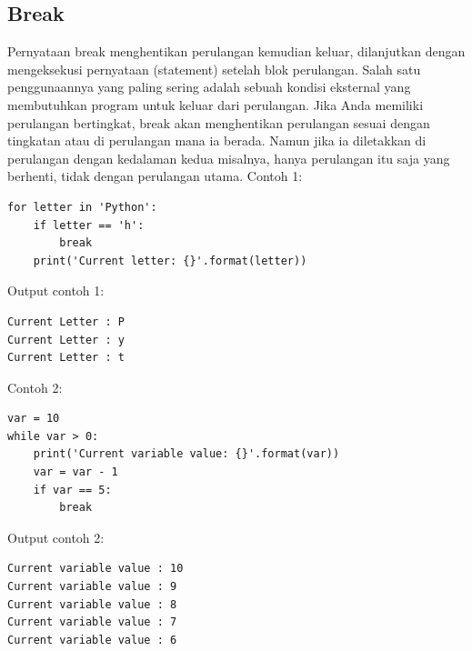 \subsection{Break}
Pernyataan break menghentikan perulangan kemudian keluar, dilanjutkan dengan mengeksekusi pernyataan (statement) setelah blok perulangan. Salah satu penggunaannya yang paling sering adalah sebuah kondisi eksternal yang membutuhkan program untuk keluar dari perulangan. Jika Anda memiliki perulangan bertingkat, break akan menghentikan perulangan sesuai dengan tingkatan atau di perulangan mana ia berada. Namun jika ia diletakkan di perulangan dengan kedalaman kedua misalnya, hanya perulangan itu saja yang berhenti, tidak dengan perulangan utama.
Contoh 1:
\begin{verbatim}
for letter in 'Python':
    if letter == 'h':
        break
    print('Current letter: {}'.format(letter))
\end{verbatim}
Output contoh 1:
\begin{verbatim}
Current Letter : P
Current Letter : y
Current Letter : t
\end{verbatim}
Contoh 2:
\begin{verbatim}
var = 10 
while var > 0:             
    print('Current variable value: {}'.format(var))
    var = var - 1
    if var == 5:
        break
\end{verbatim}
Output contoh 2:
\begin{verbatim}
Current variable value : 10
Current variable value : 9
Current variable value : 8
Current variable value : 7
Current variable value : 6
\end{verbatim}

